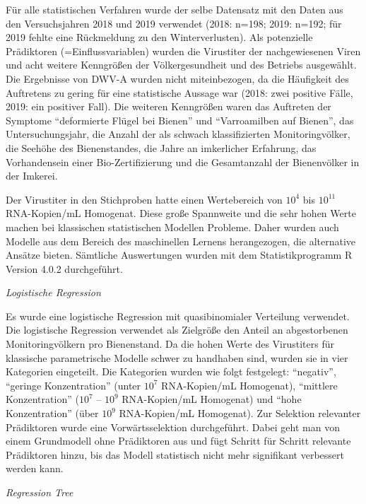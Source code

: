 Für alle statistischen Verfahren wurde der selbe Datensatz mit den Daten aus den Versuchsjahren 2018 und 2019 verwendet (2018: n=198; 2019: n=192; für 2019 fehlte eine Rückmeldung zu den Winterverlusten). Als potenzielle Prädiktoren (=Einflussvariablen) wurden die Virustiter der nachgewiesenen Viren und acht weitere Kenngrößen der Völkergesundheit und des Betriebs ausgewählt. Die Ergebnisse von DWV-A wurden nicht miteinbezogen, da die Häufigkeit des Auftretens zu gering für eine statistische Aussage war (2018: zwei positive Fälle, 2019: ein positiver Fall). Die weiteren Kenngrößen waren das Auftreten der Symptome \enquote{deformierte Flügel bei Bienen} und \enquote{Varroamilben auf Bienen}, das Untersuchungsjahr, die Anzahl der als schwach klassifizierten Monitoringvölker, die Seehöhe des Bienenstandes, die Jahre an imkerlicher Erfahrung, das Vorhandensein einer Bio-Zertifizierung und die Gesamtanzahl der Bienenvölker in der Imkerei.

Der Virustiter in den Stichproben hatte einen Wertebereich von $10^4$ bis $10^{11}$ RNA-Kopien/\si{\milli\liter} Homogenat. Diese große Spannweite und die sehr hohen Werte machen bei klassischen statistischen Modellen Probleme. Daher wurden auch Modelle aus dem Bereich des maschinellen Lernens herangezogen, die alternative Ansätze bieten. Sämtliche Auswertungen wurden mit dem Statistikprogramm R Version 4.0.2 \citep{rcoreteam2020} durchgeführt. 

\newpage

\textit{Logistische Regression}

Es wurde eine logistische Regression mit quasibinomialer Verteilung verwendet. Die logistische Regression verwendet als Zielgröße den Anteil an abgestorbenen Monitoringvölkern pro Bienenstand. Da die hohen Werte des Virustiters für klassische parametrische Modelle schwer zu handhaben sind, wurden sie in vier Kategorien eingeteilt. Die Kategorien wurden wie folgt festgelegt: \enquote{negativ}, \enquote{geringe Konzentration} (unter $10^7$ RNA-Kopien/\si{\milli\liter} Homogenat), \enquote{mittlere Konzentration} ($10^7$ – $10^9$ RNA-Kopien/\si{\milli\liter} Homogenat) und \enquote{hohe Konzentration} (über $10^9$ RNA-Kopien/\si{\milli\liter} Homogenat). Zur Selektion relevanter Prädiktoren wurde eine Vorwärtsselektion durchgeführt. Dabei geht man von einem Grundmodell ohne Prädiktoren aus und fügt Schritt für Schritt relevante Prädiktoren hinzu, bis das Modell statistisch nicht mehr signifikant verbessert werden kann. 

\textit{Regression Tree}


